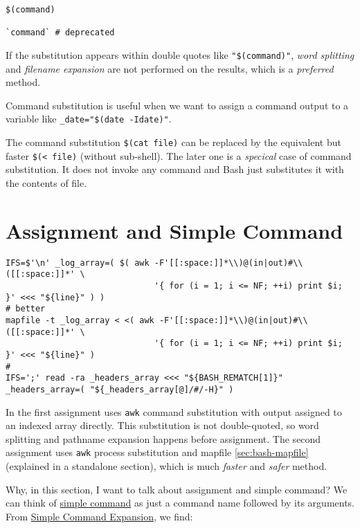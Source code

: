 \begin{lstlisting}
$(command)

`command` # deprecated
\end{lstlisting}

If the substitution appears within double quotes like
\lstinline|"$(command)"|, \textit{word splitting} and
\textit{filename expansion} are not performed on the results,
which is a \textit{preferred} method.

Command substitution is useful when we want to assign a command
output to a variable like \lstinline|_date="$(date -Idate)"|.

The command substitution \lstinline|$(cat file)| can be replaced
by the equivalent but faster
\lstinline|$(< file)| (without sub-shell). The later one is a
\textit{specical} case of command substitution. It does not invoke
any command and Bash just substitutes it with the contents of
file.

\section{Assignment and Simple Command}
\label{sec:assignm-simple-comm}

\begin{lstlisting}[basicstyle=\tiny\ttfamily]
IFS=$'\n' _log_array=( $( awk -F'[[:space:]]*\\)@(in|out)#\\([[:space:]]*' \
                              '{ for (i = 1; i <= NF; ++i) print $i; }' <<< "${line}" ) )
# better
mapfile -t _log_array < <( awk -F'[[:space:]]*\\)@(in|out)#\\([[:space:]]*' \
                              '{ for (i = 1; i <= NF; ++i) print $i; }' <<< "${line}" )
#
IFS=';' read -ra _headers_array <<< "${BASH_REMATCH[1]}"
_headers_array=( "${_headers_array[@]/#/-H}" )
\end{lstlisting}

In the first assignment uses \lstinline|awk| command substitution
with output assigned to an indexed array directly. This
substitution is not double-quoted, so word splitting and pathname
expansion happens before assignment. The second assignment uses
\lstinline|awk| process substitution and mapfile
\ref{sec:bash-mapfile} (explained in a standalone section), which
is much \textit{faster} and \textit{safer} method.

Why, in this section, I want to talk about assignment and simple
command? We can think of
\href{https://www.gnu.org/software/bash/manual/bash.html#Simple-Commands}{simple
  command} as just a command name followed by its arguments. From
\href{https://www.gnu.org/software/bash/manual/bash.html#Simple-Command-Expansion}{Simple
  Command Expansion}, we find:

